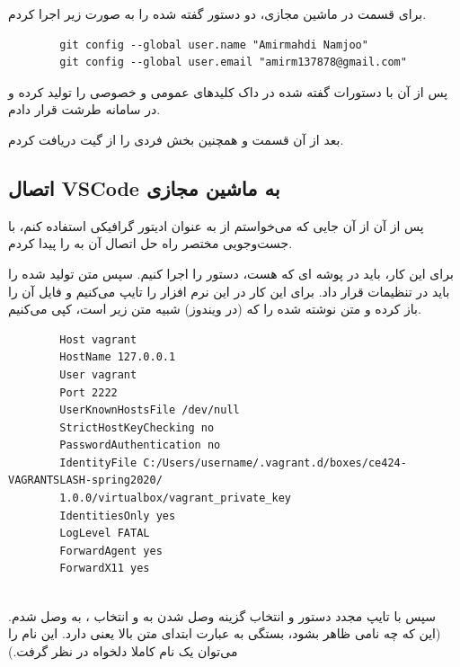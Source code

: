 \documentclass[12pt]{article}
\begin{document}
برای قسمت {} در ماشین مجازی، دو دستور گفته شده را به صورت زیر اجرا کردم.

\begin{latin}
	\begin{verbatim}
		git config --global user.name "Amirmahdi Namjoo"
		git config --global user.email "amirm137878@gmail.com"
	\end{verbatim}
	
\end{latin}


پس از آن با دستورات گفته شده در داک کلیدهای عمومی و خصوصی را تولید کرده و در سامانه طرشت قرار دادم.

بعد از آن قسمت  و همچنین بخش فردی را از گیت دریافت کردم.


\subsection{اتصال VSCode به ماشین مجازی}

پس از آن از آن جایی که می‌خواستم از  به عنوان ادیتور گرافیکی استفاده کنم، با جست‌وجویی مختصر راه حل اتصال  آن به  را پیدا کردم.

برای این کار، باید در پوشه ای که  هست، دستور  را اجرا کنیم. سپس متن تولید شده را باید در تنظیمات  قرار داد. برای این کار در  این نرم افزار  را تایپ می‌کنیم و فایل  آن را باز کرده و متن نوشته شده را که (در ویندوز) شبیه متن زیر است، کپی می‌کنیم.

\begin{latin}
	\begin{verbatim}
		Host vagrant
		HostName 127.0.0.1
		User vagrant
		Port 2222
		UserKnownHostsFile /dev/null
		StrictHostKeyChecking no
		PasswordAuthentication no
		IdentityFile C:/Users/username/.vagrant.d/boxes/ce424-VAGRANTSLASH-spring2020/
		1.0.0/virtualbox/vagrant_private_key
		IdentitiesOnly yes
		LogLevel FATAL
		ForwardAgent yes
		ForwardX11 yes
		
	\end{verbatim}
\end{latin}

سپس با تایپ مجدد دستور  و انتخاب گزینه وصل شدن به  و انتخاب ، به  وصل شدم. (این که چه نامی ظاهر بشود، بستگی به عبارت ابتدای متن بالا یعنی   دارد. این نام را می‌توان یک نام کاملا دلخواه در نظر گرفت.)
\end{document}
